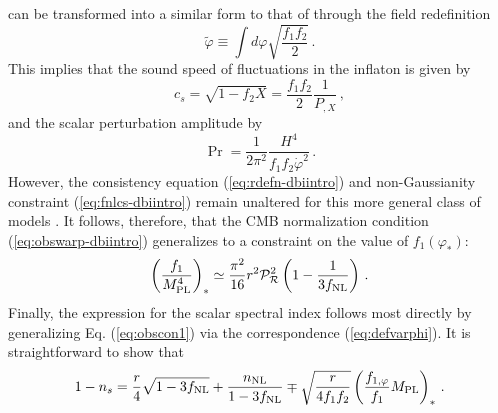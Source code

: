 can be transformed into a similar form to that of 
 through the field redefinition 
% 
\begin{equation}
\label{eq:defvarphi}
\tilde{\varphi} \equiv \int d \varphi \sqrt{\frac{f_1f_2}{2}}  \,.
\end{equation}
% 
This implies that the sound speed of fluctuations in 
the inflaton is given by
%  
\begin{equation}
\label{eq:cs-dbi}
c_s = \sqrt{1-f_2 X} = \frac{f_1f_2}{2} \frac{1}{P_{,X}}  \,,
\end{equation}
% 
and the scalar perturbation amplitude by
% 
\begin{equation}
\label{eq:spectrum-dbi}
\Pr = \frac{1}{2\pi^2}\frac{H^4}{f_1f_2\dot{\varphi}^2}  \,.
\end{equation}
% 
However, the consistency equation (\ref{eq:rdefn-dbiintro}) and 
non-Gaussianity constraint (\ref{eq:fnlcs-dbiintro}) remain unaltered 
for this more general class 
of models \cite{lidser2}. It 
follows, therefore, 
that the CMB normalization condition (\ref{eq:obswarp-dbiintro}) 
generalizes to a constraint on the value of $f_1 (\varphi_*)$:
%   
\begin{equation}
\label{eq:observef1}
\left( \frac{f_1}{M_{\mathrm{PL}}^4} \right)_{*} \simeq \frac{\pi^2}{16} r^2\mathcal{P}_{\mathcal{R}}^2 
\left( 1- \frac{1}{3f_{\mathrm{NL}}} \right)  \,.
\end{equation}
% 
Finally, the expression for the scalar spectral index
follows most directly by generalizing Eq. (\ref{eq:obscon1}) 
via the correspondence (\ref{eq:defvarphi}). It  
is straightforward to show that
%  
\begin{equation}
\label{eq:nsconstraintW}
1-n_s = \frac{r}{4} \sqrt{1-3f_{\mathrm{NL}}}
 +\frac{n_{\mathrm{NL}}}{1-3f_{\mathrm{NL}}} \mp \sqrt{\frac{r}{4f_1f_2}} \left( 
\frac{f_{1,\varphi}}{f_1} M_{\mathrm{PL}} \right)_*  \,.
\end{equation}
% 


